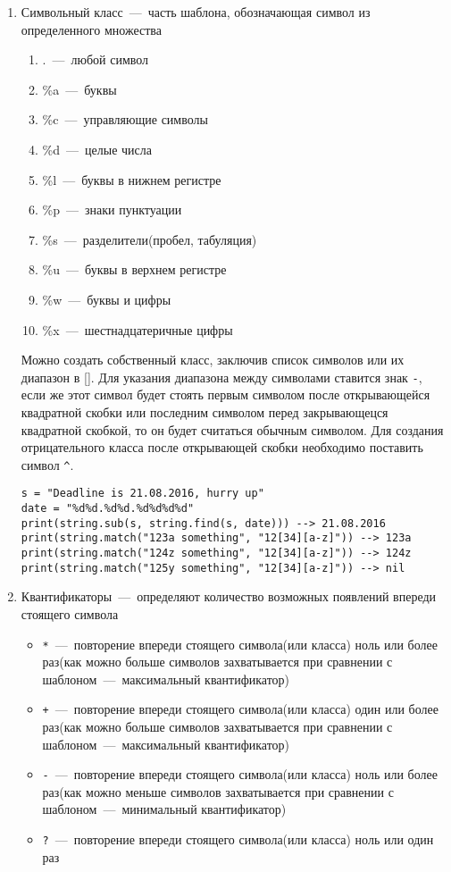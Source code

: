 \begin{enumerate}
	\item Символьный класс~---~часть шаблона, обозначающая символ из определенного множества
	
	\begin{enumerate}
	 \item .~---~любой символ
	 \item \%a~---~буквы
	 \item \%c~---~управляющие символы
	 \item \%d~---~целые числа
	 \item \%l~---~буквы в нижнем регистре
	 \item \%p~---~знаки пунктуации
	 \item \%s~---~разделители(пробел, табуляция)
	 \item \%u~---~буквы в верхнем регистре
	 \item \%w~---~буквы и цифры
	 \item \%x~---~шестнадцатеричные цифры
	\end{enumerate}
	
	Можно создать собственный класс, заключив список символов или их диапазон в []. Для указания диапазона между символами ставится знак \lstinline{-}, если же этот символ будет стоять первым символом после открывающейся квадратной скобки или последним символом перед закрывающецся квадратной скобкой, то он будет считаться обычным символом. Для создания отрицательного класса после открывающей скобки необходимо поставить символ \lstinline{^}. 
	
\begin{lstlisting}
s = "Deadline is 21.08.2016, hurry up"
date = "%d%d.%d%d.%d%d%d%d"
print(string.sub(s, string.find(s, date))) --> 21.08.2016
print(string.match("123a something", "12[34][a-z]")) --> 123a
print(string.match("124z something", "12[34][a-z]")) --> 124z
print(string.match("125y something", "12[34][a-z]")) --> nil
\end{lstlisting}
	
	\item Квантификаторы~---~определяют количество возможных появлений впереди стоящего символа
	\begin{itemize}
		\item \lstinline{*}~---~повторение впереди стоящего символа(или класса) ноль или более раз(как можно больше символов захватывается при сравнении с шаблоном~---~максимальный квантификатор)
		\item \lstinline{+}~---~повторение впереди стоящего символа(или класса) один или более раз(как можно больше символов захватывается при сравнении с шаблоном~---~максимальный квантификатор)
		\item \lstinline{-}~---~повторение впереди стоящего символа(или класса) ноль или более раз(как можно меньше символов захватывается при сравнении с шаблоном~---~минимальный квантификатор)
		\item \lstinline{?}~---~повторение впереди стоящего символа(или класса) ноль или один раз
	\end{itemize}
	

\end{enumerate}

